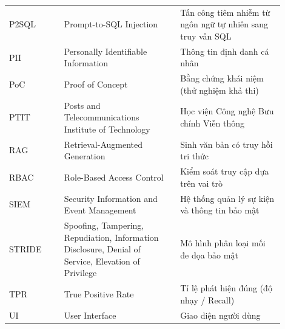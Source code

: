 \begin{longtable}{p{0.18\linewidth} >{\raggedright\arraybackslash}p{0.38\linewidth} >{\raggedright\arraybackslash}p{0.34\linewidth}}
\addlinespace
P2SQL & Prompt-to-SQL Injection & Tấn công tiêm nhiễm từ ngôn ngữ tự nhiên sang truy vấn SQL \\
\addlinespace
PII & Personally Identifiable Information & Thông tin định danh cá nhân \\
\addlinespace
PoC & Proof of Concept & Bằng chứng khái niệm (thử nghiệm khả thi) \\
\addlinespace
PTIT & Posts and Telecommunications Institute of Technology & Học viện Công nghệ Bưu chính Viễn thông \\
\addlinespace
RAG & Retrieval-Augmented Generation & Sinh văn bản có truy hồi tri thức \\
\addlinespace
RBAC & Role-Based Access Control & Kiểm soát truy cập dựa trên vai trò \\
\addlinespace
SIEM & Security Information and Event Management & Hệ thống quản lý sự kiện và thông tin bảo mật \\
\addlinespace
STRIDE & Spoofing, Tampering, Repudiation, Information Disclosure, Denial of Service, Elevation of Privilege & Mô hình phân loại mối đe dọa bảo mật \\
\addlinespace
TPR & True Positive Rate & Tỉ lệ phát hiện đúng (độ nhạy / Recall) \\
\addlinespace
UI & User Interface & Giao diện người dùng \\

\end{longtable}
